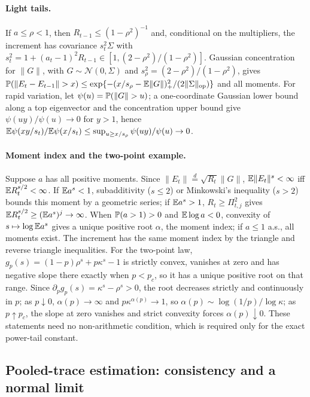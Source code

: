 \paragraph{Light tails.} If $a\le\rho<1$, then $R_{t-1}\le(1-\rho^2)^{-1}$ and, conditional on the multipliers, the increment has covariance $s_t^2\Sigma$ with $s_t^2=1+(a_t-1)^2R_{t-1}\in[1,(2-\rho^2)/(1-\rho^2)]$. Gaussian concentration for $\|G\|$, with $G\sim\mathcal N(0,\Sigma)$ and $s_\rho^2=(2-\rho^2)/(1-\rho^2)$, gives $\PP(\|E_t-E_{t-1}\|>x)\le\exp\{-(x/s_\rho-\EE\|G\|)_+^2/(2\|\Sigma\|_{\mathrm{op}})\}$ and all moments. For rapid variation, let $\psi(u)=\PP(\|G\|>u)$; a one-coordinate Gaussian lower bound along a top eigenvector and the concentration upper bound give $\psi(uy)/\psi(u)\to0$ for $y>1$, hence $\mathbb{E}\psi(xy/s_t)/\mathbb{E}\psi(x/s_t)\le\sup_{u\ge x/s_\rho}\psi(uy)/\psi(u)\to0$.

\paragraph{Moment index and the two-point example.} Suppose $a$ has all positive moments. Since $\|E_t\|\overset{d}{=}\sqrt{R_t}\|G\|$, $\mathbb{E}\|E_t\|^s<\infty$ iff $\mathbb{E} R_t^{s/2}<\infty$. If $\mathbb{E} a^s<1$, subadditivity ($s\le2$) or Minkowski's inequality ($s>2$) bounds this moment by a geometric series; if $\mathbb{E} a^s>1$, $R_t\ge\Pi_{t,j}^2$ gives $\mathbb{E} R_t^{s/2}\ge(\mathbb{E} a^s)^j\to\infty$. When $\mathbb{P}(a>1)>0$ and $\mathbb{E}\log a<0$, convexity of $s\mapsto\log\mathbb{E} a^s$ gives a unique positive root $\alpha$, the moment index; if $a\le1$ a.s., all moments exist. The increment has the same moment index by the triangle and reverse triangle inequalities. For the two-point law, $g_p(s)=(1-p)\rho^s+p\kappa^s-1$ is strictly convex, vanishes at zero and has negative slope there exactly when $p<p_c$, so it has a unique positive root on that range. Since $\partial_pg_p(s)=\kappa^s-\rho^s>0$, the root decreases strictly and continuously in $p$; as $p\downarrow0$, $\alpha(p)\to\infty$ and $p\kappa^{\alpha(p)}\to1$, so $\alpha(p)\sim\log(1/p)/\log\kappa$; as $p\uparrow p_c$, the slope at zero vanishes and strict convexity forces $\alpha(p)\downarrow0$. These statements need no non-arithmetic condition, which is required only for the exact power-tail constant.

\subsection{Pooled-trace estimation: consistency and a normal limit}\label{app:hill}


